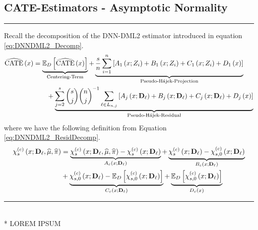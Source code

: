 \subsection{CATE-Estimators - Asymptotic Normality}
\hrule
Recall the decomposition of the DNN-DML2 estimator introduced in equation \ref{eq:DNNDML2_Decomp}.
\begin{equation}\label{eq:DNNDML2_Decomp}
    \begin{aligned}
        \widehat{\operatorname{CATE}}\left(x\right)
        & = \underbrace{\mathbb{E}_{D}\left[\widehat{\operatorname{CATE}}\left(x\right)\right]}_{\text{Centering-Term}}
        + \underbrace{\frac{s}{n} \sum_{i = 1}^{n} \left[A_{1}\left(x; Z_{i}\right) + B_{1}\left(x; Z_{i}\right) + C_{1}\left(x; Z_{i}\right) + D_{1}\left(x\right)\right]}_{\text{Pseudo-H\'ajek-Projection}}\\
        & \quad \quad + \underbrace{\sum_{j = 2}^{s} \binom{s}{j} \binom{n}{j}^{-1}\sum_{\ell \in L_{n,j}} \left[A_{j}\left(x; \mathbf{D}_{\ell}\right) + B_{j}\left(x; \mathbf{D}_{\ell}\right) + C_{j}\left(x; \mathbf{D}_{\ell}\right) + D_{j}\left(x\right)\right]}_{\text{Pseudo-H\'ajek-Residual}}
    \end{aligned}
\end{equation}
where we have the following definition from Equation \ref{eq:DNNDML2_ResidDecomp}.
\begin{equation}\label{eq:DNNDML2_ResidDecomp}
    \begin{aligned}
        \chi_{s}^{(c)}\left(x; \mathbf{D}_{\ell}, \widehat{\mu}, \widehat{\pi}\right)
        & = \underbrace{\chi_{s}^{(c)}\left(x; \mathbf{D}_{\ell}, \widehat{\mu}, \widehat{\pi}\right) - \chi_{s}^{(c)}\left(x; \mathbf{D}_{\ell}\right)}_{A_{c}\left(x; \mathbf{D}_{\ell}\right)}
        + \underbrace{\chi_{s}^{(c)}\left(x; \mathbf{D}_{\ell}\right) - \chi_{s,0}^{(c)}\left(x; \mathbf{D}_{\ell}\right)}_{B_{c}\left(x; \mathbf{D}_{\ell}\right)} \\
        & + \underbrace{\chi_{s,0}^{(c)}\left(x; \mathbf{D}_{\ell}\right) - \mathbb{E}_{D}\left[\chi_{s,0}^{(c)}\left(x; \mathbf{D}_{\ell}\right)\right]}_{C_{c}\left(x; \mathbf{D}_{\ell}\right)}
        + \underbrace{\mathbb{E}_{D}\left[\chi_{s,0}^{(c)}\left(x; \mathbf{D}_{\ell}\right)\right]}_{D_{c}\left(x\right)}
    \end{aligned}
\end{equation}

\hrule

\begin{lem}\label{lem:A_resid}\mbox{}\\*
    {\color{red} LOREM IPSUM}
\end{lem}

